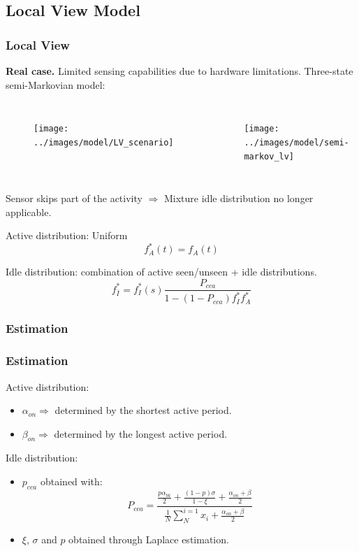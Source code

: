 \documentclass[9pt,handout,serif]{beamer}
\begin{document}
\subsection{Local View Model}
\begin{frame}[c]
	\frametitle{Local View}
	\textbf{Real case.} Limited sensing capabilities due to hardware limitations.	
	Three-state semi-Markovian model:
	\begin{columns}[c]
			\begin{figure}
				\texttt{[image: ../images/model/LV\_scenario]}
			\end{figure}
			\begin{figure}
				\texttt{[image: ../images/model/semi-markov\_lv]}
			\end{figure}
	\end{columns}
	
	Sensor skips part of the activity $\Rightarrow$ Mixture idle distribution no longer applicable.
	
	Active distribution: Uniform
	\begin{equation}
		f_A^{*}(t) = f_A(t)
	\end{equation}

	Idle distribution: combination of active seen/unseen + idle distributions.
	\begin{equation}
		f_{\bar{I}}^{*}=f_I^{*}(s)\frac{P_{cca}}{1-(1-P_{cca})f_I^{*}f_A^{*}}
	\end{equation}
	
\end{frame}

\subsubsection*{Estimation}
\begin{frame}[c]
	\frametitle{Estimation}
	Active distribution:
	\begin{itemize}
		\item $\alpha_{on} \Rightarrow$ determined by the shortest active period.
		\item $\beta_{on} \Rightarrow$ determined by the longest active period.
	\end{itemize}
	
	\vspace{0.2in}
	Idle distribution:\\
	\begin{itemize}
		\item $p_{cca}$ obtained with:
		\begin{equation}
			P_{cca} = \frac{\frac{p\alpha_{bk}}{2}+\frac{(1-p)\sigma}{1-\xi}+\frac{\alpha_{on}+\beta}{2}}{\frac{1}{N}\sum_{N}^{i=1}x_i+\frac{\alpha_{on}+\beta}{2}}
		\end{equation}
		\item $\xi$, $\sigma$ and $p$ obtained through Laplace estimation.
	\end{itemize}
\end{frame}
\end{document}
